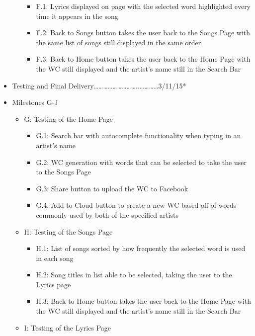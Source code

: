 \documentclass[]{article}
\begin{document}
\begin{itemize}
\begin{itemize}
    \begin{itemize}
    \itemsep1pt\parskip0pt
    \item
      F.1: Lyrics displayed on page with the selected word highlighted
      every time it appears in the song
    \item
      F.2: Back to Songs button takes the user back to the Songs Page
      with the same list of songs still displayed in the same order
    \item
      F.3: Back to Home button takes the user back to the Home Page with
      the WC still displayed and the artist's name still in the Search
      Bar
    \end{itemize}
  \end{itemize}
\item
  Testing and Final
  Delivery\ldots{}\ldots{}\ldots{}\ldots{}\ldots{}\ldots{}\ldots{}\ldots{}\ldots{}..\ldots{}\ldots{}\ldots{}\ldots{}3/11/15*
\item
  Milestones G-J

  \begin{itemize}
  \itemsep1pt\parskip0pt
  \item
    G: Testing of the Home Page

    \begin{itemize}
    \itemsep1pt\parskip0pt
    \item
      G.1: Search bar with autocomplete functionality when typing in an
      artist's name
    \item
      G.2: WC generation with words that can be selected to take the
      user to the Songs Page
    \item
      G.3: Share button to upload the WC to Facebook
    \item
      G.4: Add to Cloud button to create a new WC based off of words
      commonly used by both of the specified artists
    \end{itemize}
  \item
    H: Testing of the Songs Page

    \begin{itemize}
    \itemsep1pt\parskip0pt
    \item
      H.1: List of songs sorted by how frequently the selected word is
      used in each song
    \item
      H.2: Song titles in list able to be selected, taking the user to
      the Lyrics page
    \item
      H.3: Back to Home button takes the user back to the Home Page with
      the WC still displayed and the artist's name still in the Search
      Bar
    \end{itemize}
  \item
    I: Testing of the Lyrics Page


\end{itemize}
\end{itemize}
\end{document}
